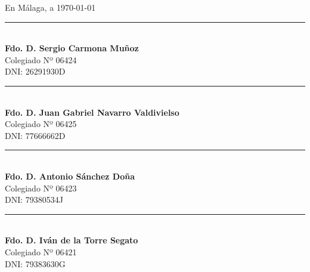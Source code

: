 \documentclass[11pt,a4paper]{article}
\begin{document}
\noindent\begin{minipage}{\textwidth}
    \begin{flushright}
        En Málaga, a \today
    \end{flushright}
    \vspace{2cm}

    \noindent
    \begin{minipage}[t]{0.45\textwidth}
        \centering
        \rule{6cm}{0.6pt} \\
        \textbf{Fdo. D. Sergio Carmona Muñoz} \\
        Colegiado Nº 06424 \\
        DNI: 26291930D
    \end{minipage}
    \hfill
    \begin{minipage}[t]{0.45\textwidth}
        \centering
        \rule{6cm}{0.6pt} \\
        \textbf{Fdo. D. Juan Gabriel Navarro Valdivielso} \\
        Colegiado Nº 06425 \\
        DNI: 77666662D
    \end{minipage}

    \vspace{2cm}

    \noindent
    \begin{minipage}[t]{0.45\textwidth}
        \centering
        \rule{6cm}{0.6pt} \\
        \textbf{Fdo. D. Antonio Sánchez Doña} \\
        Colegiado Nº 06423 \\
        DNI: 79380534J
    \end{minipage}
    \hfill
    \begin{minipage}[t]{0.45\textwidth}
        \centering
        \rule{6cm}{0.6pt} \\
        \textbf{Fdo. D. Iván de la Torre Segato} \\
        Colegiado Nº 06421 \\
        DNI: 79383630G
    \end{minipage}
\end{minipage}
\newpage


\end{document}
